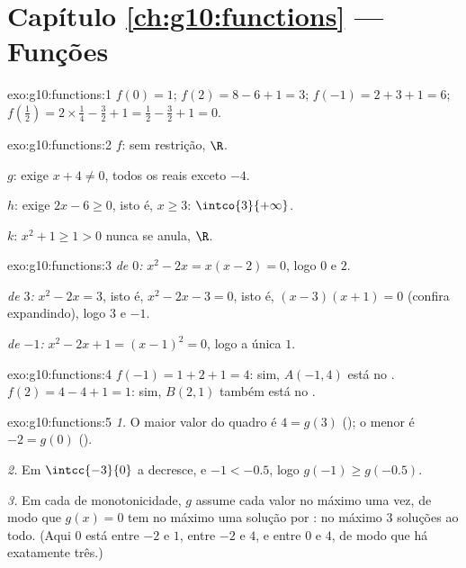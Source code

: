 \section*{Capítulo \ref{ch:g10:functions} --- Funções}

\begin{solution}{exo:g10:functions:1}
$f(0) = 1$; \quad $f(2) = 8 - 6 + 1 = 3$; \quad
$f(-1) = 2 + 3 + 1 = 6$; \quad
$f\!\left(\tfrac12\right) = 2 \times \tfrac14 - \tfrac32 + 1 = \tfrac12 -
\tfrac32 + 1 = 0$.
\end{solution}

\begin{solution}{exo:g10:functions:2}
$f$: sem restrição,  $\R$.

$g$: exige $x + 4 \neq 0$,  todos os reais exceto $-4$.

$h$: exige $2x - 6 \geq 0$, isto é, $x \geq 3$: 
$\intco{3}{+\infty}$.

$k$: $x^2 + 1 \geq 1 > 0$ nunca se anula,  $\R$.
\end{solution}

\begin{solution}{exo:g10:functions:3}
\emph{ de $0$:} $x^2 - 2x = x(x-2) = 0$, logo $0$ e $2$.

\emph{ de $3$:} $x^2 - 2x = 3$, isto é, $x^2 - 2x - 3 = 0$,
isto é, $(x-3)(x+1) = 0$ (confira expandindo), logo $3$ e $-1$.

\emph{ de $-1$:} $x^2 - 2x + 1 = (x - 1)^2 = 0$, logo a única
 $1$.
\end{solution}

\begin{solution}{exo:g10:functions:4}
$f(-1) = 1 + 2 + 1 = 4$: sim, $A(-1, 4)$ está no .
$f(2) = 4 - 4 + 1 = 1$: sim, $B(2, 1)$ também está no .
\end{solution}

\begin{solution}{exo:g10:functions:5}
\emph{1.} O maior valor do quadro é $4 = g(3)$ (); o menor é
$-2 = g(0)$ ().

\emph{2.} Em $\intcc{-3}{0}$ a  decresce, e $-1 < -0.5$, logo
$g(-1) \geq g(-0.5)$.

\emph{3.} Em cada  de monotonicidade, $g$ assume cada valor no
máximo uma vez, de modo que $g(x) = 0$ tem no máximo uma solução por
: no máximo $3$ soluções ao todo. (Aqui $0$ está entre $-2$ e
$1$, entre $-2$ e $4$, e entre $0$ e $4$, de modo que há exatamente
três.)
\end{solution}

